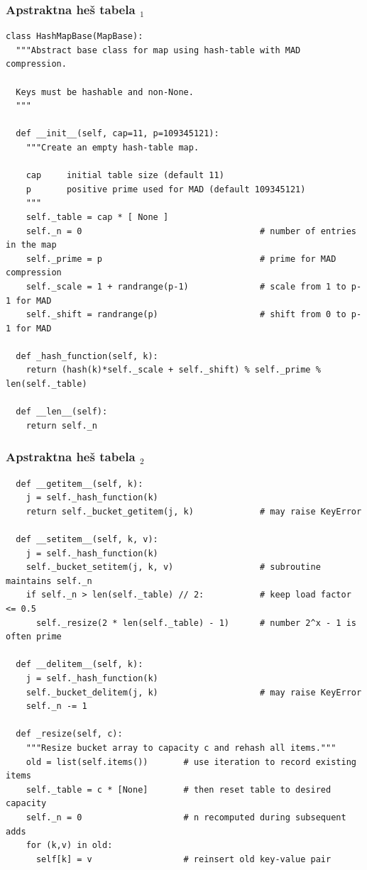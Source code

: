 \documentclass[compress]{beamer}
\begin{document}
\begin{frame}
  \frametitle{Apstraktna heš tabela $_1$}
\begin{verbatim}
class HashMapBase(MapBase):
  """Abstract base class for map using hash-table with MAD compression.

  Keys must be hashable and non-None.
  """

  def __init__(self, cap=11, p=109345121):
    """Create an empty hash-table map.

    cap     initial table size (default 11)
    p       positive prime used for MAD (default 109345121)
    """
    self._table = cap * [ None ]
    self._n = 0                                   # number of entries in the map
    self._prime = p                               # prime for MAD compression
    self._scale = 1 + randrange(p-1)              # scale from 1 to p-1 for MAD
    self._shift = randrange(p)                    # shift from 0 to p-1 for MAD

  def _hash_function(self, k):
    return (hash(k)*self._scale + self._shift) % self._prime % len(self._table)

  def __len__(self):
    return self._n
\end{verbatim}
\end{frame}

\begin{frame}
  \frametitle{Apstraktna heš tabela $_2$}
\begin{verbatim}
  def __getitem__(self, k):
    j = self._hash_function(k)
    return self._bucket_getitem(j, k)             # may raise KeyError

  def __setitem__(self, k, v):
    j = self._hash_function(k)
    self._bucket_setitem(j, k, v)                 # subroutine maintains self._n
    if self._n > len(self._table) // 2:           # keep load factor <= 0.5
      self._resize(2 * len(self._table) - 1)      # number 2^x - 1 is often prime

  def __delitem__(self, k):
    j = self._hash_function(k)
    self._bucket_delitem(j, k)                    # may raise KeyError
    self._n -= 1

  def _resize(self, c):
    """Resize bucket array to capacity c and rehash all items."""
    old = list(self.items())       # use iteration to record existing items
    self._table = c * [None]       # then reset table to desired capacity
    self._n = 0                    # n recomputed during subsequent adds
    for (k,v) in old:
      self[k] = v                  # reinsert old key-value pair
\end{verbatim}
\end{frame}
\end{document}

